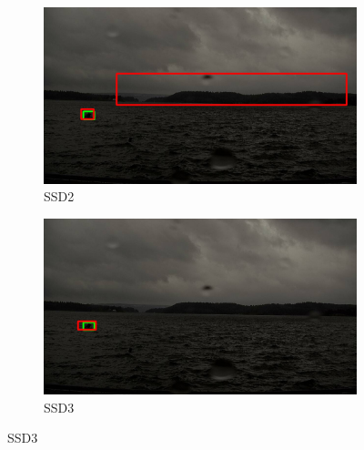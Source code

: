 \begin{figure}[h!]
\begin{subfigure}{.5\textwidth}
  \centering
  \includegraphics[width=0.9\linewidth]{results/case_buildings/bigbox_bcbf/SSD2/selected_06_14_axis0049.jpg}
  \caption{SSD2}
  \label{fig:sfig1}
\end{subfigure}%
\begin{subfigure}{.5\textwidth}
  \centering
  \includegraphics[width=.9\linewidth]{results/case_buildings/bigbox_bcbf/SSD3/selected_06_14_axis0049.jpg}
  \caption{SSD3}
  \label{fig:sfig2}
\end{subfigure}


\end{figure}
